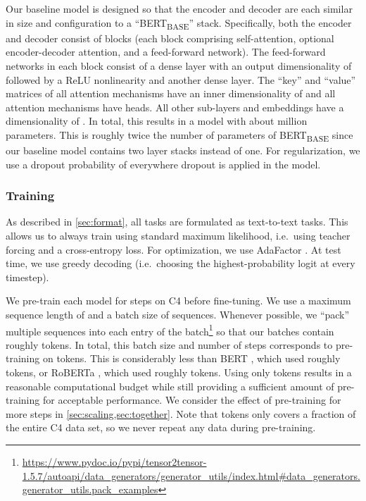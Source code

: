 \documentclass[twoside,11pt]{article}
\begin{document}
Our baseline model is designed so that the encoder and decoder are each similar in size and configuration to a ``BERT\textsubscript{BASE}'' \citep{devlin2018bert} stack.
Specifically, both the encoder and decoder consist of  blocks (each block comprising self-attention, optional encoder-decoder attention, and a feed-forward network).
The feed-forward networks in each block consist of a dense layer with an output dimensionality of  followed by a ReLU nonlinearity and another dense layer.
The ``key'' and ``value'' matrices of all attention mechanisms have an inner dimensionality of  and all attention mechanisms have  heads.
All other sub-layers and embeddings have a dimensionality of .
In total, this results in a model with about  million parameters.
This is roughly twice the number of parameters of BERT\textsubscript{BASE} since our baseline model contains two layer stacks instead of one.
For regularization, we use a dropout probability of  everywhere dropout is applied in the model.

\subsubsection{Training}
\label{sec:training}

As described in \cref{sec:format}, all tasks are formulated as text-to-text tasks.
This allows us to always train using standard maximum likelihood, i.e.\ using teacher forcing \citep{williams1989learning} and a cross-entropy loss.
For optimization, we use AdaFactor \citep{shazeer2018adafactor}.
At test time, we use greedy decoding (i.e.\ choosing the highest-probability logit at every timestep).

We pre-train each model for  steps on C4 before fine-tuning.
We use a maximum sequence length of  and a batch size of  sequences.
Whenever possible, we ``pack'' multiple sequences into each entry of the batch\footnote{\url{https://www.pydoc.io/pypi/tensor2tensor-1.5.7/autoapi/data_generators/generator_utils/index.html\#data_generators.generator_utils.pack_examples}} so that our batches contain roughly  tokens.
In total, this batch size and number of steps corresponds to pre-training on  tokens.
This is considerably less than BERT \citep{devlin2018bert}, which used roughly  tokens, or RoBERTa \citep{liu2019roberta}, which used roughly  tokens.
Using only  tokens results in a reasonable computational budget while still providing a sufficient amount of pre-training for acceptable performance.
We consider the effect of pre-training for more steps in \cref{sec:scaling,sec:together}.
Note that  tokens only covers a fraction of the entire C4 data set, so we never repeat any data during pre-training.
\end{document}
